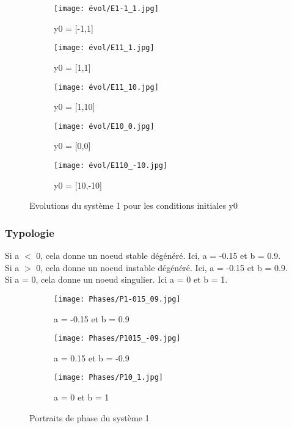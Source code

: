 \documentclass[utf8]{article}
\begin{document}
\begin{figure}[!htb]
\centering
\begin{subfigure}{.3\textwidth}
  \centering
  \texttt{[image: évol/E1-1\_1.jpg]}
  \caption{y0 = [-1,1]}
  \label{fig:sub1}
\end{subfigure}%
\begin{subfigure}{.3\textwidth}
  \centering
  \texttt{[image: évol/E11\_1.jpg]}
  \caption{y0 = [1,1]}
  \label{fig:sub2}
  \end{subfigure}
  \begin{subfigure}{.3\textwidth}
  \centering
  \texttt{[image: évol/E11\_10.jpg]}
  \caption{y0 = [1,10]}
  \end{subfigure}%
  \begin{subfigure}{.3\textwidth}
  \centering
  \texttt{[image: évol/E10\_0.jpg]}
  \caption{y0 = [0,0]}
  \end{subfigure}
  \begin{subfigure}{.3\textwidth}
  \centering
  \texttt{[image: évol/E110\_-10.jpg]}
  \caption{y0 = [10,-10]}
  \end{subfigure}
\caption{Evolutions du système 1 pour les conditions initiales y0}
\end{figure}

\subsubsection{Typologie}

Si a $<$ 0, cela donne un noeud stable dégénéré. Ici, a = -0.15 et b = 0.9.
\\
Si a $>$ 0, cela donne un noeud instable dégénéré. Ici, a = -0.15 et b = 0.9.
\\
Si a = 0, cela donne un noeud singulier. Ici a = 0 et b = 1.

\begin{figure}[!htb]
\centering
\begin{subfigure}{.5\textwidth}
  \centering
  \texttt{[image: Phases/P1-015\_09.jpg]}
  \caption{a = -0.15 et b = 0.9}
  \label{fig:sub1}
\end{subfigure}%
\begin{subfigure}{.5\textwidth}
  \centering
  \texttt{[image: Phases/P1015\_-09.jpg]}
  \caption{a = 0.15 et b = -0.9}
  \label{fig:sub2}
  \end{subfigure}
  \begin{subfigure}{.5\textwidth}
  \centering
  \texttt{[image: Phases/P10\_1.jpg]}
  \caption{a = 0 et b = 1}
  \end{subfigure}%
\caption{Portraits de phase du système 1}
\end{figure}
\end{document}
